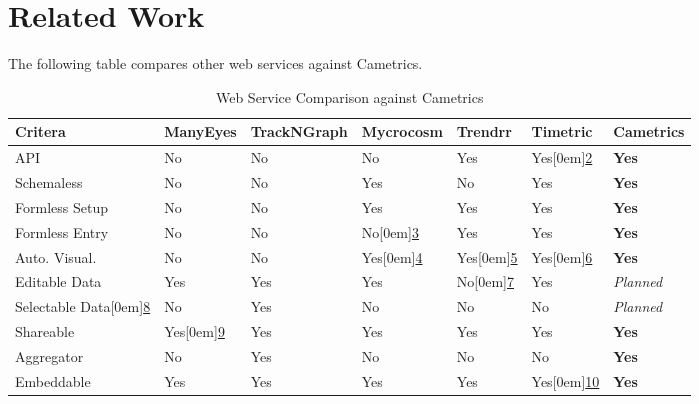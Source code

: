 \documentclass[10pt,a4paper,english]{article}
\newlength{\locallinewidth}
\begin{document}
\section*{Related Work}
\label{related-work}

The following table compares other web services against Cametrics.

\leavevmode
\begin{longtable}[c]{|p{0.18\locallinewidth}|p{0.114\locallinewidth}|p{0.104\locallinewidth}|p{0.114\locallinewidth}|p{0.104\locallinewidth}|p{0.104\locallinewidth}|p{0.124\locallinewidth}|}
\caption{Web Service Comparison against Cametrics}\\
\hline
\textbf{
Critera
} & \textbf{
ManyEyes
} & \textbf{
TrackNGraph
} & \textbf{
Mycrocosm
} & \textbf{
Trendrr
} & \textbf{
Timetric
} & \textbf{
Cametrics
} \\
\hline
\endhead

API
 & 
No
 & 
No
 & 
No
 & 
Yes
 & 
Yes\raisebox{.5em}[0em]{\scriptsize\hyperlink{id12}{2}}
 & 
\textbf{Yes}
 \\
\hline

Schemaless
 & 
No
 & 
No
 & 
Yes
 & 
No
 & 
Yes
 & 
\textbf{Yes}
 \\
\hline

Formless Setup
 & 
No
 & 
No
 & 
Yes
 & 
Yes
 & 
Yes
 & 
\textbf{Yes}
 \\
\hline

Formless Entry
 & 
No
 & 
No
 & 
No\raisebox{.5em}[0em]{\scriptsize\hyperlink{id13}{3}}
 & 
Yes
 & 
Yes
 & 
\textbf{Yes}
 \\
\hline

Auto. Visual.
 & 
No
 & 
No
 & 
Yes\raisebox{.5em}[0em]{\scriptsize\hyperlink{id14}{4}}
 & 
Yes\raisebox{.5em}[0em]{\scriptsize\hyperlink{id15}{5}}
 & 
Yes\raisebox{.5em}[0em]{\scriptsize\hyperlink{id16}{6}}
 & 
\textbf{Yes}
 \\
\hline

Editable Data
 & 
Yes
 & 
Yes
 & 
Yes
 & 
No\raisebox{.5em}[0em]{\scriptsize\hyperlink{id17}{7}}
 & 
Yes
 & 
\emph{Planned}
 \\
\hline

Selectable Data\raisebox{.5em}[0em]{\scriptsize\hyperlink{id18}{8}}
 & 
No
 & 
Yes
 & 
No
 & 
No
 & 
No
 & 
\emph{Planned}
 \\
\hline

Shareable
 & 
Yes\raisebox{.5em}[0em]{\scriptsize\hyperlink{id19}{9}}
 & 
Yes
 & 
Yes
 & 
Yes
 & 
Yes
 & 
\textbf{Yes}
 \\
\hline

Aggregator
 & 
No
 & 
Yes
 & 
No
 & 
No
 & 
No
 & 
\textbf{Yes}
 \\
\hline

Embeddable
 & 
Yes
 & 
Yes
 & 
Yes
 & 
Yes
 & 
Yes\raisebox{.5em}[0em]{\scriptsize\hyperlink{id20}{10}}
 & 
\textbf{Yes}
 \\
\hline
\end{longtable}
\end{document}
